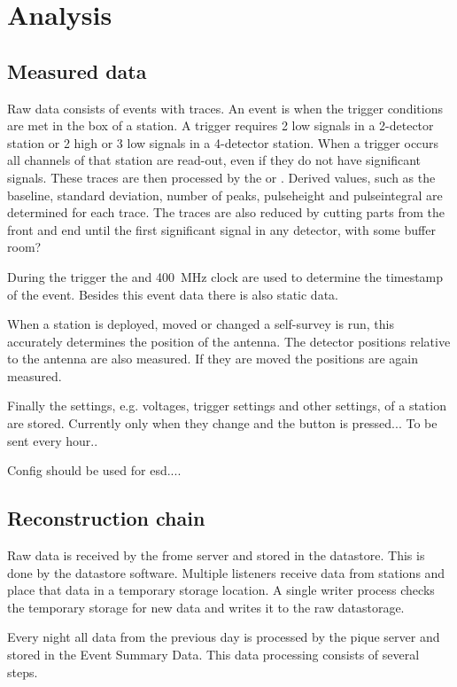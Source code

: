 \chapter{Analysis}
\label{ch:analysis}


\section{Measured data}

Raw data consists of events with traces. An event is when the trigger
conditions are met in the \hisparc box of a station. A trigger requires
2 low signals in a 2-detector station or 2 high or 3 low signals in a
4-detector station. When a trigger occurs all \pmt channels of that
station are read-out, even if they do not have significant signals.
These traces are then processed by the \daq or \pysparc. Derived
values, such as the baseline, standard deviation, number of peaks,
pulseheight and pulseintegral are determined for each trace. The traces
are also reduced by cutting parts from the front and end until the first
significant signal in any detector, with some buffer room?

During the trigger the \gps and \SI{400}{\mega\hertz} clock are used to
determine the \gps timestamp of the event. Besides this event data there
is also static data.

When a station is deployed, moved or changed a \gps self-survey is run,
this accurately determines the position of the \gps antenna. The
detector positions relative to the \gps antenna are also measured. If
they are moved the positions are again measured.

Finally the settings, e.g. \pmt voltages, trigger settings and other
settings, of a station are stored. Currently only when they change and
the button is pressed... To be sent every hour..

Config should be used for esd....


\section{Reconstruction chain}

Raw data is received by the frome server and stored in the \hisparc
datastore. This is done by the datastore software. Multiple listeners
receive data from stations and place that data in a temporary storage
location. A single writer process checks the temporary storage for new
data and writes it to the raw datastorage.

Every night all data from the previous day is processed by the pique
server and stored in the Event Summary Data. This data processing
consists of several steps.

